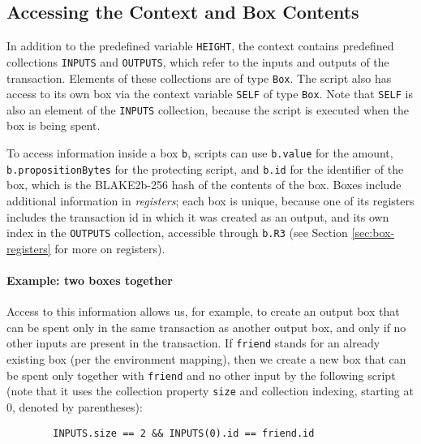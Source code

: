 \documentclass[11pt]{article}
\newcommand{\authnote}[2]{\marginpar{\parbox{\marginparwidth}{\tiny %
  \textsf{#1 {\textcolor{blue}{notes: #2}}}}}%
  \textcolor{blue}{\textbf{\dag}}}
\newcommand{\authnote}[2]{
  \textsf{#1 \textcolor{blue}{: #2}}}
\newcommand{\authnote}[2]{}
\newcommand{\lnote}[1]{{\authnote{\textcolor{orange}{Leo notes}}{#1}}}
\begin{document}
\lnote{Should we have an example with fees? According to Dima, fees are implemented as boxes with TrueLeaf as a proposition, last transaction in a block consumes all this just created boxes and in favor of miner.}


\subsection{Accessing the Context and Box Contents}
\label{sec:context}
In addition to the predefined variable \texttt{HEIGHT}, the context contains predefined collections \texttt{INPUTS} and \texttt{OUTPUTS}, which refer to the inputs and outputs of the transaction. Elements of these collections are of type \texttt{Box}. The script also has access to its own box via the context variable \texttt{SELF} of type \texttt{Box}. Note that \texttt{SELF} is also an element of the \texttt{INPUTS} collection, because the script is executed when the box is being spent.

To access information inside a box \texttt{b}, scripts can use \texttt{b.value} for the amount, \texttt{b.propositionBytes} for the protecting script, and \texttt{b.id} for the identifier of the box, which is the BLAKE2b-256 hash of the contents of the box. Boxes include additional information in \emph{registers};  each box is unique, because one of its registers includes the transaction id in which it was created as an output, and its own index in the \texttt{OUTPUTS} collection, accessible through \texttt{b.R3} (see Section \ref{sec:box-registers} for more on registers).

\paragraph{Example: two boxes together}
Access to this information allows us, for example, to create an output box that can be spent only in the same transaction as another output box, and only if no other inputs are present in the transaction. If \texttt{friend} stands for an already existing box (per the environment mapping), then we create a new box that can be spent only together with \texttt{friend} and no other input by the following script (note that it uses the collection property \texttt{size} and collection indexing, starting at 0, denoted by parentheses):

\begin{verbatim}
        INPUTS.size == 2 && INPUTS(0).id == friend.id
\end{verbatim}
\end{document}
